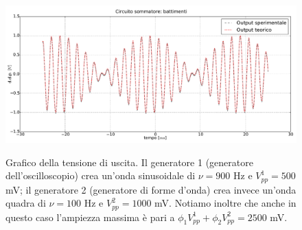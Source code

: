 \begin{figure}[ht]
 \centering
   {\includegraphics[width=17.5cm]{../E01/latex/battimenti_ideali.pdf}}
 \caption{Grafico della tensione di uscita. Il generatore 1 (generatore dell'oscilloscopio) crea un'onda sinusoidale di $\nu=900$ \si{\hertz} e $V^1_{pp}=500$ \si{\milli\volt}; il generatore 2 (generatore di forme d'onda) crea invece un'onda quadra di $\nu=100$ \si{\hertz} e $V^2_{pp}=1000$ \si{\milli\volt}. Notiamo inoltre che anche in questo caso l'ampiezza massima è pari a $\phi_1 V^1_{pp}+\phi_2 V^2_{pp}=2500$ \si{\milli\volt}.}
 \label{gr:battimenti}
\end{figure}